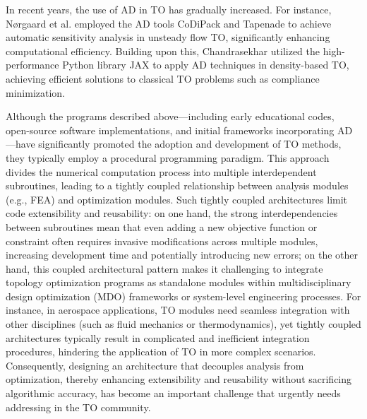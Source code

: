 \documentclass[mathpazo]{cicp}
\begin{document}
In recent years, the use of AD in TO has gradually increased. For instance, Nørgaard et al.\cite{norgaard2017applications} employed the AD tools CoDiPack and Tapenade to achieve automatic sensitivity analysis in unsteady flow TO, significantly enhancing computational efficiency. Building upon this, Chandrasekhar\cite{chandrasekhar2021auto} utilized the high-performance Python library JAX \cite{bradbury2018jax} to apply AD techniques in density-based TO, achieving efficient solutions to classical TO problems such as compliance minimization.

Although the programs described above—including early educational codes, open-source software implementations, and initial frameworks incorporating AD—have significantly promoted the adoption and development of TO methods, they typically employ a procedural programming paradigm. This approach divides the numerical computation process into multiple interdependent subroutines, leading to a tightly coupled relationship between analysis modules (e.g., FEA) and optimization modules. Such tightly coupled architectures limit code extensibility and reusability: on one hand, the strong interdependencies between subroutines mean that even adding a new objective function or constraint often requires invasive modifications across multiple modules, increasing development time and potentially introducing new errors; on the other hand, this coupled architectural pattern makes it challenging to integrate topology optimization programs as standalone modules within multidisciplinary design optimization (MDO) frameworks or system-level engineering processes. For instance, in aerospace applications, TO modules need seamless integration with other disciplines (such as fluid mechanics or thermodynamics), yet tightly coupled architectures typically result in complicated and inefficient integration procedures, hindering the application of TO in more complex scenarios. Consequently, designing an architecture that decouples analysis from optimization, thereby enhancing extensibility and reusability without sacrificing algorithmic accuracy, has become an important challenge that urgently needs addressing in the TO community.
\end{document}
